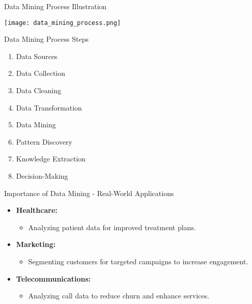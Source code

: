 \documentclass[aspectratio=169]{beamer}
\begin{document}
\begin{frame}[fragile]{Data Mining Process Illustration}
    \begin{center}
        \texttt{[image: data\_mining\_process.png]} %
    \end{center}
    \begin{block}{Data Mining Process Steps}
        \begin{enumerate}
            \item Data Sources
            \item Data Collection
            \item Data Cleaning
            \item Data Transformation
            \item Data Mining
            \item Pattern Discovery
            \item Knowledge Extraction
            \item Decision-Making
        \end{enumerate}
    \end{block}
\end{frame}

\begin{frame}[fragile]{Importance of Data Mining - Real-World Applications}
    \begin{itemize}
        \item \textbf{Healthcare:} 
            \begin{itemize}
                \item Analyzing patient data for improved treatment plans.
            \end{itemize}
        \item \textbf{Marketing:} 
            \begin{itemize}
                \item Segmenting customers for targeted campaigns to increase engagement.
            \end{itemize}
        \item \textbf{Telecommunications:} 
            \begin{itemize}
                \item Analyzing call data to reduce churn and enhance services.
            \end{itemize}
    \end{itemize}
\end{frame}
\end{document}
